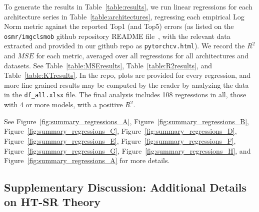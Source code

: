 To generate the results in Table~\ref{table:results}, we run linear regressions for each architecture series in Table~\ref{table:architectures}, regressing each empirical Log Norm metric against the reported Top1 (and Top5) errors (as listed on the \texttt{osmr/imgclsmob} github repository README file~\cite{osmr}, with the relevant data extracted and provided in our github repo as \texttt{pytorchcv.html}).
We record the $R^{2}$ and $MSE$ for each metric, averaged over all regressions for all architectures and datasets.
See Table~\ref{table:MSEresults}, Table~\ref{table:R2results}, and Table~\ref{table:KTresults}.
In the repo, plots are provided for every regression, and more fine grained results may be computed by the reader by analyzing the data in the \texttt{df\_all.xlsx} file.
The final analysis includes 108 regressions in all, those with 4 or more models, with a positive $R^2$.

See
Figure~\ref{fig:summary_regressions_A},
Figure~\ref{fig:summary_regressions_B},
Figure~\ref{fig:summary_regressions_C},
Figure~\ref{fig:summary_regressions_D},
Figure~\ref{fig:summary_regressions_E},
Figure~\ref{fig:summary_regressions_F},
Figure~\ref{fig:summary_regressions_G},
Figure~\ref{fig:summary_regressions_H}, and
Figure~\ref{fig:summary_regressions_A} for more details.














\subsection{Supplementary Discussion: Additional Details on HT-SR Theory}

